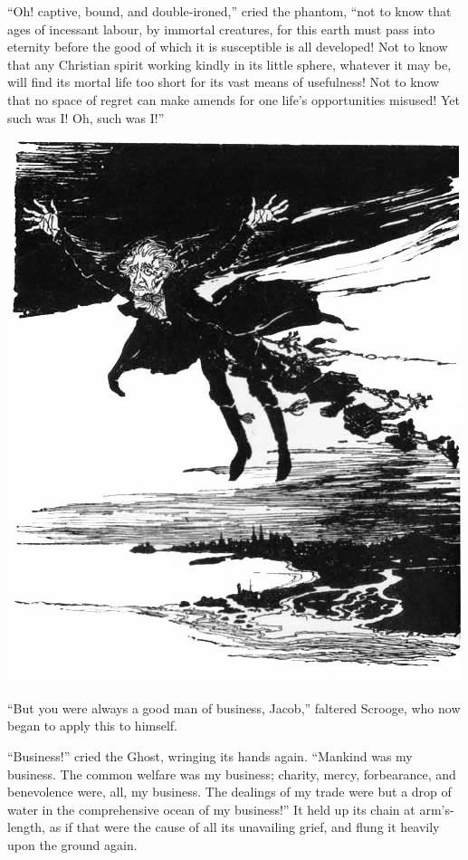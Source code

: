 \documentclass[paper=a5,BCOR=15mm,twoside,DIV=15,headinclude=off,12pt,chapterprefix=off,openany,headings=huge]{scrbook} %
\begin{document}
\enquote{Oh! captive, bound, and double-ironed,} cried the phantom, \enquote{not to know that ages of incessant labour, by immortal creatures, for this earth must pass into eternity before the good of which it is susceptible is all developed! Not to know that any Christian spirit working kindly in its little sphere, whatever it may be, will find its mortal life too short for its vast means of usefulness! Not to know that no space of regret can make amends for one life's opportunities misused! Yet such was I! Oh, such was I!}
\cleardoubleevenemptypage
\begin{center} 
\vfill
    \includegraphics[width=\columnwidth]{gs045}
    \vfill
\end{center}
\newpage

\enquote{But you were always a good man of business, Jacob,} faltered Scrooge, who now began to apply this to himself.

\enquote{Business!} cried the Ghost, wringing its hands again. \enquote{Mankind was my business. The common welfare was my business; charity, mercy, forbearance, and benevolence were, all, my business. The dealings of my trade were but a drop of water in the comprehensive ocean of my business!}
It held up its chain at arm's-length, as if that were the cause of all its unavailing grief, and flung it heavily upon the ground again.
\end{document}
